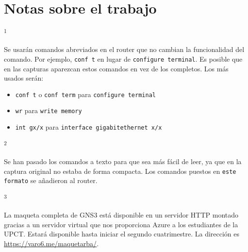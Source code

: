 \documentclass{article}
\begin{document}
\newpage
\section*{Notas sobre el trabajo}
\hypertarget{nota1}{\textsuperscript{1}} Se usarán comandos abreviados en el router que no cambian la funcionalidad del comando. Por ejemplo, \texttt{conf t} en lugar de \texttt{configure terminal}. Es posible que en las capturas aparezcan estos comandos en vez de los completos. Los más usados serán:
\begin{itemize}
    \item \texttt{conf t} o \texttt{conf term} para \texttt{configure terminal}
    \item \texttt{wr} para \texttt{write memory}
    \item \texttt{int gx/x} para \texttt{interface gigabitethernet x/x}
\end{itemize}

\hypertarget{nota2}{\textsuperscript{2}} Se han pasado los comandos a texto para que sea más fácil de leer, ya que en la captura original no estaba de forma compacta. Los comandos puestos en \texttt{este formato} se añadieron al router.

\quad

\hypertarget{nota3}{\textsuperscript{3}} La maqueta completa de GNS3 está disponible en un servidor HTTP montado gracias a un servidor virtual que nos proporciona Azure a los estudiantes de la UPCT. Estará disponible hasta iniciar el segundo cuatrimestre. La dirección es \url{https://varo6.me/maquetarba/}.
\end{document}
